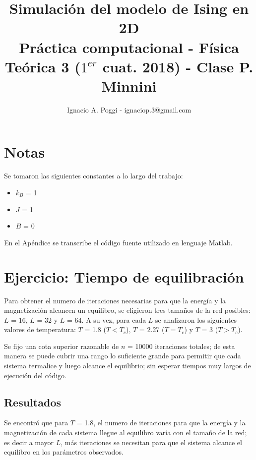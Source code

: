 \documentclass[a4paper,12pt]{article}
\begin{document}
 

\title{Simulaci\'on del modelo de Ising en 2D \\
\large Pr\'actica computacional - F\'isica Te\'orica 3 ($1^{er}$ cuat. 2018) - Clase P. Minnini}
\author{Ignacio A. Poggi - ignaciop.3@gmail.com}
\maketitle

\section{Notas}

Se tomaron las siguientes constantes a lo largo del trabajo:

\begin{itemize}
\item $k_{B}$ = 1
\item $J$ = 1
\item $B$ = 0
\end{itemize}

En el Ap\'endice se transcribe el c\'odigo fuente utilizado en lenguaje Matlab.

\section{Ejercicio: Tiempo de equilibraci\'on}

Para obtener el numero de iteraciones necesarias para que la energ\'ia y la magnetizaci\'on alcancen un equilibro, se eligieron tres tama\~nos de la red posibles: $L$ = 16, $L$ = 32 y $L$ = 64.
A su vez, para cada $L$ se analizaron los siguientes valores de temperatura: $T$ = 1.8 ($T < T_{c}$), $T$ = 2.27 ($T = T_{c}$) y $T$ = 3 ($T > T_{c}$).

Se fijo una cota superior razonable de $n$ = 10000 iteraciones totales; de esta manera se puede cubrir una rango lo suficiente grande para permitir que cada sistema termalice y luego alcance el equilibrio; sin esperar tiempos muy largos de ejecuci\'on del c\'odigo.

\subsection{Resultados}

Se encontr\'o que para $T$ = 1.8, el numero de iteraciones para que la energ\'ia y la magnetizaci\'on de cada sistema llegue al equilibro var\'ia con el tama\~no de la red; es decir a mayor $L$, m\'as iteraciones se necesitan para que el sistema alcance el equilibro en los par\'ametros observados.
\end{document}
